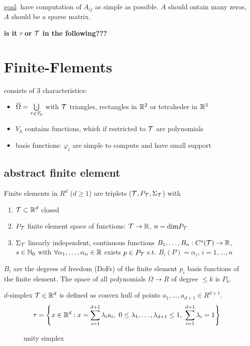 \underline{goal}: have computation of $A_{ij}$ as simple as possible. $A$ should ontain many zeros, $A$ should be a sparse matrix.


\textbf{is it }$\tau$ \textbf{ or } $\mathcal{T}$ \textbf{in the following???}
\section{Finite-Flements}
consists of 3 characteristics:
\begin{itemize}
	\item $\overline{\Omega}= \underset{\tau \in \T_h}{\bigcupdot}$ with $\mathcal{T}$ triangles, rectangles in $\mathbb{R}^2$ or tetraheder in $\mathbb{R}^3$
	

%
	
	\item $V_h$ contains functions, which if restricted to $\mathcal{T}$ are polynomials
	\item basis functions: $\varphi_i$ are simple to compute and have small support
\end{itemize}
\subsection{abstract finite element}
\begin{definition_}
	Finite elements in $R^d$ ($d\geq 1$) are triplets ($\mathcal{T},P_{\mathcal{T}},\Sigma_{\mathcal{T}}$) with 
	\begin{enumerate}[label=(\roman*)]
		\item $\mathcal{T} \subset \mathbb{R}^d$ closed
		\item $P_{\mathcal{T}}$ finite element space of functions: $\mathcal{T} \to \mathbb{R}$, $n = \text{dim}P_{\mathcal{T}}$
		\item $\Sigma_{\mathcal{T}}$ linearly independent, continuous functions $B_1,\dots,B_n:C^s(\mathcal{T}) \to \mathbb{R}$, $s \in \mathbb{N}_0$ with $\forall \alpha_1, \dots, \alpha_n \in \mathbb{R}$ exists $p \in P_{\mathcal{T}}$ s.t. $B_i (P) = \alpha_i$, $i = 1, \dots,n$
	\end{enumerate}
\end{definition_}
$B_i$ are the degrees of freedom (DoFs) of the finite element $p_i$ basis functions of the finite element. The space of all polynomials $\Omega \to R$ of degree $\leq k$ is $P_k$.

$d$-simplex $\mathcal{T} \in \mathbb{R}^d$ is defined as convex hull of points $a_1,\dots,a_{d+1}\in R^{d+1}$.
\begin{equation*}
	\tau = \left\{ x\in \mathbb{R}^d: x= \displaystyle \sum^{d+1}_{i=1} \lambda_ia_i,\ 0 \leq \lambda_1, \dots,\lambda_{d+1}\leq 1,\ \displaystyle \sum^{d+1}_{i=1} \lambda_i =1\right\}
\end{equation*}

\begin{figure}[h!]
\center

\caption{unity simplex}
\label{AbbUnitySimplex}
\end{figure}
